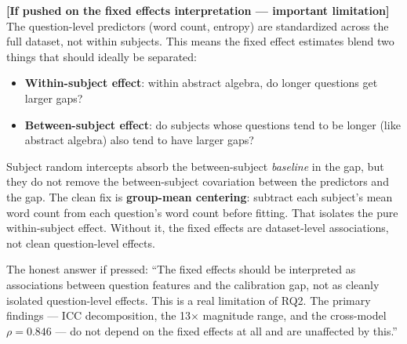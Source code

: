 \documentclass[aspectratio=169,11pt]{beamer}
\begin{document}
{  \textbf{[If pushed on the fixed effects interpretation --- important limitation]}
  The question-level predictors (word count, entropy) are standardized across the
  full dataset, not within subjects. This means the fixed effect estimates blend two
  things that should ideally be separated:
  \begin{itemize}
    \item \textbf{Within-subject effect}: within abstract algebra, do longer questions
      get larger gaps?
    \item \textbf{Between-subject effect}: do subjects whose questions tend to be
      longer (like abstract algebra) also tend to have larger gaps?
  \end{itemize}
  Subject random intercepts absorb the between-subject \emph{baseline} in the gap,
  but they do not remove the between-subject covariation between the predictors and
  the gap. The clean fix is \textbf{group-mean centering}: subtract each subject's
  mean word count from each question's word count before fitting. That isolates the
  pure within-subject effect. Without it, the fixed effects are dataset-level
  associations, not clean question-level effects.

  The honest answer if pressed: ``The fixed effects should be interpreted as
  associations between question features and the calibration gap, not as cleanly
  isolated question-level effects. This is a real limitation of RQ2. The primary
  findings --- ICC decomposition, the 13$\times$ magnitude range, and the
  cross-model $\rho = 0.846$ --- do not depend on the fixed effects at all and
  are unaffected by this.''
}

\end{document}

